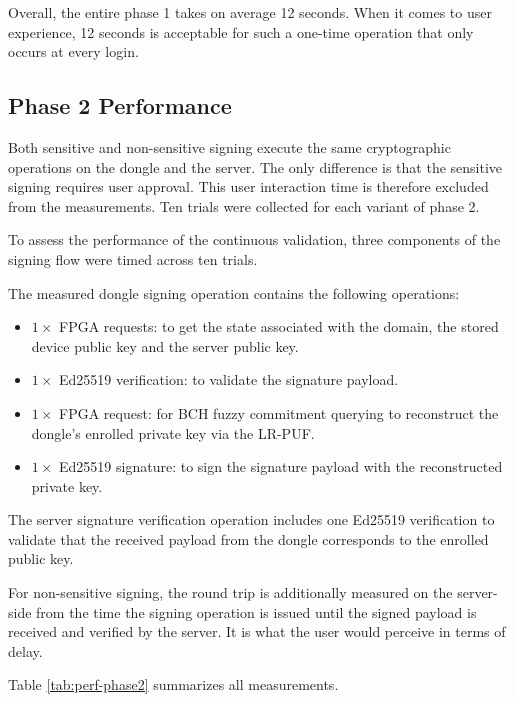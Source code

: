 Overall, the entire phase 1 takes on average 12 seconds. When it comes to user experience, 12 seconds is acceptable for such a one-time operation that only occurs at every login.

\subsection{Phase 2 Performance}

Both sensitive and non-sensitive signing execute the same cryptographic operations on the dongle and the server. The only difference is that the sensitive signing requires user approval. This user interaction time is therefore excluded from the measurements. Ten trials were collected for each variant of phase 2.

To assess the performance of the continuous validation, three components of the signing flow were timed across ten trials.

The measured dongle signing operation contains the following operations:
\begin{itemize}
    \item $1\times$ FPGA requests: to get the state associated with the domain, the stored device public key and the server public key.
    \item $1\times$ Ed25519 verification: to validate the signature payload.
    \item $1\times$ FPGA request: for BCH fuzzy commitment querying to reconstruct the dongle's enrolled private key via the LR-PUF.
    \item $1\times$ Ed25519 signature: to sign the signature payload with the reconstructed private key.
\end{itemize}

The server signature verification operation includes one Ed25519 verification to validate that the received payload from the dongle corresponds to the enrolled public key.

For non-sensitive signing, the round trip is additionally measured on the server-side from the time the signing operation is issued until the signed payload is received and verified by the server. It is what the user would perceive in terms of delay.

Table \ref{tab:perf-phase2} summarizes all measurements.

